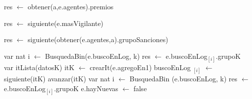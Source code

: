 \begin{algorithm}[H]
\begin{algorithmic}[1]
 
    \State res $\gets$ obtener(a,e.agentes).premios
\EndFunction
\end{algorithmic}
\end{algorithm}

\begin{algorithm}[H]
\begin{algorithmic}[1]
 
    \State res $\gets$ siguiente(e.masVigilante)
\EndFunction
\end{algorithmic}
\end{algorithm}


\begin{algorithm}[H]
\begin{algorithmic}[1]
 
    \State res $\gets$ siguiente(obtener(e.agentes,a).grupoSanciones)
\EndFunction
\end{algorithmic}
\end{algorithm}

\begin{algorithm}[H]
\begin{algorithmic}[1]
 
	 
		 \State var nat i $\gets$ BusquedaBin(e.buscoEnLog, k) 
		 \State res $\gets$ e.buscoEnLog$_{[i]}$.grupoK 
	\Else
		 \State var itLista(datosK) itK $\gets$ crearIt(e.agregoEn1) 
		  
		 	\State buscoEnLog $_{[i]}$ $\gets$ siguiente(itK) 
		 	\State avanzar(itK)
		 \EndWhile
		 \State var nat i $\gets$ BusquedaBin (e.buscoEnLog, k) 
		 \State res $\gets$ e.buscoEnLog$_{[i]}$.grupoK 
		 \State e.hayNuevas $\gets$ false 
	\EndIf
\EndFunction
\end{algorithmic}
\end{algorithm}

